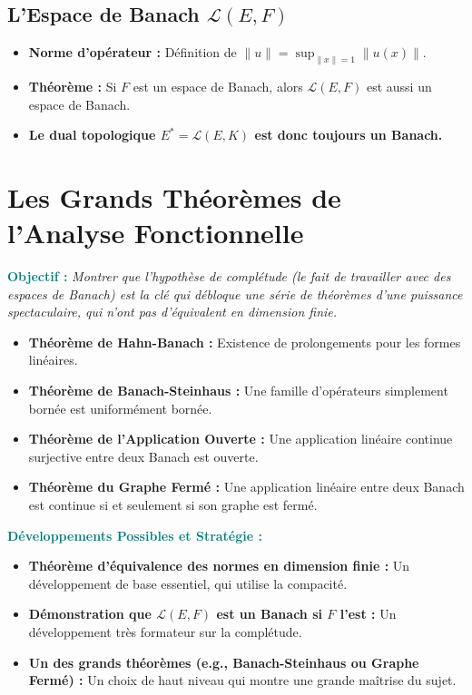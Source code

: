 \documentclass[12pt, a4paper, parskip=full]{report}
\theoremstyle{agregstyle}
\newenvironment{objectif}
  {\par\medskip\noindent\begin{oframed}\noindent\textbf{\textcolor{teal}{Objectif :}}\itshape}
  {\end{oframed}\par\medskip}
\newenvironment{developpements}
  {\par\medskip\noindent\begin{oframed}\noindent\textbf{\textcolor{teal}{Développements Possibles et Stratégie :}}}
  {\end{oframed}\par\medskip}
\begin{document}
\subsection{L'Espace de Banach $\mathcal{L}(E,F)$}
\begin{itemize}
    \item \textbf{Norme d'opérateur :} Définition de $\|u\| = \sup_{\|x\|=1} \|u(x)\|$.
    \item \textbf{Théorème :} Si $F$ est un espace de Banach, alors $\mathcal{L}(E,F)$ est aussi un espace de Banach.
    \item \textbf{Le dual topologique $E^* = \mathcal{L}(E, K)$ est donc toujours un Banach.}
\end{itemize}

\section{Les Grands Théorèmes de l'Analyse Fonctionnelle}
\begin{objectif}
    Montrer que l'hypothèse de complétude (le fait de travailler avec des espaces de Banach) est la clé qui débloque une série de théorèmes d'une puissance spectaculaire, qui n'ont pas d'équivalent en dimension finie.
\end{objectif}
\begin{itemize}
    \item \textbf{Théorème de Hahn-Banach :} Existence de prolongements pour les formes linéaires.
    \item \textbf{Théorème de Banach-Steinhaus :} Une famille d'opérateurs simplement bornée est uniformément bornée.
    \item \textbf{Théorème de l'Application Ouverte :} Une application linéaire continue surjective entre deux Banach est ouverte.
    \item \textbf{Théorème du Graphe Fermé :} Une application linéaire entre deux Banach est continue si et seulement si son graphe est fermé.
\end{itemize}

\begin{developpements}
    \begin{itemize}
        \item \textbf{Théorème d'équivalence des normes en dimension finie :} Un développement de base essentiel, qui utilise la compacité.
        \item \textbf{Démonstration que $\mathcal{L}(E,F)$ est un Banach si $F$ l'est :} Un développement très formateur sur la complétude.
        \item \textbf{Un des grands théorèmes (e.g., Banach-Steinhaus ou Graphe Fermé) :} Un choix de haut niveau qui montre une grande maîtrise du sujet.
    \end{itemize}
\end{developpements}
\end{document}

